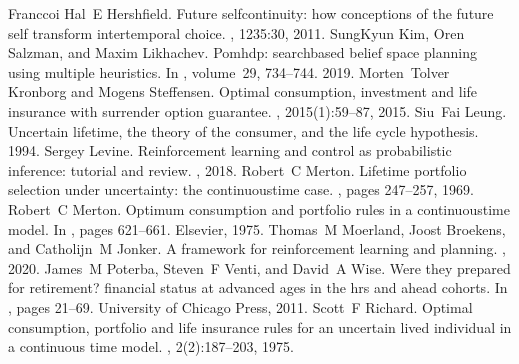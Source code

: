 \documentclass[letterpaper,10pt,english]{jupyterBook}
\begin{document}
\begin{sphinxthebibliography}{Franccoi}
\sphinxAtStartPar
Hal E Hershfield. Future self\sphinxhyphen{}continuity: how conceptions of the future self transform intertemporal choice. , 1235:30, 2011.
\sphinxAtStartPar
Sung\sphinxhyphen{}Kyun Kim, Oren Salzman, and Maxim Likhachev. Pomhdp: search\sphinxhyphen{}based belief space planning using multiple heuristics. In , volume 29, 734–744. 2019.
\sphinxAtStartPar
Morten Tolver Kronborg and Mogens Steffensen. Optimal consumption, investment and life insurance with surrender option guarantee. , 2015(1):59–87, 2015.
\sphinxAtStartPar
Siu Fai Leung. Uncertain lifetime, the theory of the consumer, and the life cycle hypothesis. 1994.
\sphinxAtStartPar
Sergey Levine. Reinforcement learning and control as probabilistic inference: tutorial and review. , 2018.
\sphinxAtStartPar
Robert C Merton. Lifetime portfolio selection under uncertainty: the continuous\sphinxhyphen{}time case. , pages 247–257, 1969.
\sphinxAtStartPar
Robert C Merton. Optimum consumption and portfolio rules in a continuous\sphinxhyphen{}time model. In , pages 621–661. Elsevier, 1975.
\sphinxAtStartPar
Thomas M Moerland, Joost Broekens, and Catholijn M Jonker. A framework for reinforcement learning and planning. , 2020.
\sphinxAtStartPar
James M Poterba, Steven F Venti, and David A Wise. Were they prepared for retirement? financial status at advanced ages in the hrs and ahead cohorts. In , pages 21–69. University of Chicago Press, 2011.
\sphinxAtStartPar
Scott F Richard. Optimal consumption, portfolio and life insurance rules for an uncertain lived individual in a continuous time model. , 2(2):187–203, 1975.

\end{sphinxthebibliography}
\end{document}
